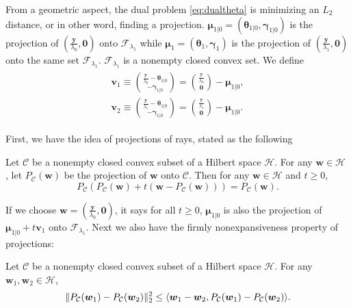 From a geometric aspect, the dual problem \eqref{eq:dualtheta} is minimizing an $L_2$ distance, or in other word, finding a projection. $\boldsymbol\mu_{1|0}=(\boldsymbol \theta_{1|0},\boldsymbol \gamma_{1|0})$ is the projection of $(\frac{\boldsymbol y}{\lambda_0},\boldsymbol0)$ onto $\mathcal{F}_{\lambda_1}$ while $\boldsymbol\mu_1=(\boldsymbol \theta_{1},\boldsymbol \gamma_{1})$ is the projection of $(\frac{\boldsymbol y}{\lambda_1},\boldsymbol0)$ onto the same set $\mathcal{F}_{\lambda_1}$. $\mathcal{F}_{\lambda_1}$ is a nonempty closed convex set. We define
\begin{gather}
    \label{eq:1.2.1}
    \begin{aligned}
        \boldsymbol v_1\equiv\binom{\frac{\boldsymbol y}{\lambda_0}-\boldsymbol \theta_{1|0}}{-\boldsymbol \gamma_{1|0}}=\binom{\frac{\boldsymbol y}{\lambda_0}}{\boldsymbol0}-\boldsymbol\mu_{1|0},\\
        \boldsymbol v_2\equiv \binom{\frac{\boldsymbol y}{\lambda_1}-\boldsymbol \theta_{1|0}}{-\boldsymbol \gamma_{1|0}}=\binom{\frac{\boldsymbol y}{\lambda_1}}{\boldsymbol0}-\boldsymbol\mu_{1|0}.
    \end{aligned}
\end{gather}

First, we have the idea of projections of rays, stated as the following
\begin{lemma}
    \citep{Bauschke2011}
    Let $\mathcal{C}$ be a nonempty closed convex subset of a Hilbert space $\mathcal{H}$. For any $\boldsymbol w\in\mathcal{H}$ , let $P_{\mathcal{C}}(\boldsymbol w)$ be the projection of $\boldsymbol w$ onto $\mathcal{C}$. Then for any $\boldsymbol w\in\mathcal{H}$ and $t\geq 0$,
    \begin{equation}
        P_{\mathcal{C}}\left(P_{\mathcal{C}}(\boldsymbol w)+t\left(\boldsymbol w-P_{\mathcal{C}}(\boldsymbol w)\right)\right)=P_{\mathcal{C}}(\boldsymbol w).
    \end{equation}
\end{lemma}

If we choose $\boldsymbol w=(\frac{\boldsymbol y}{\lambda_0},\boldsymbol0)$, it says for all $t\geq 0$, $\boldsymbol\mu_{1|0}$ is also the projection of $\boldsymbol\mu_{1|0}+t\boldsymbol v_1$ onto $\mathcal{F}_{\lambda_1}$. Next we also have the firmly nonexpansiveness property of projections:
\begin{lemma}
    \citep{Bauschke2011}
    Let $\mathcal{C}$ be a nonempty closed convex subset of a Hilbert space $\mathcal{H}$. For any $\boldsymbol w_1,\boldsymbol w_2\in\mathcal{H}$,
    \begin{equation}
        \lVert P_{\mathcal{C}}(\boldsymbol w_1)-P_{\mathcal{C}}(\boldsymbol w_2)\rVert_2^2\leq \langle\boldsymbol w_1-\boldsymbol w_2, P_{\mathcal{C}}(\boldsymbol w_1)-P_{\mathcal{C}}(\boldsymbol w_2)\rangle.
    \end{equation}
\end{lemma}

